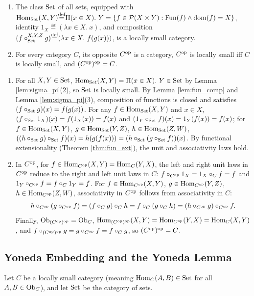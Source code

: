 \documentclass[10pt,a4paper]{article}
\begin{document}
\begin{lemma}\label{lem:set_and_op}
\begin{enumerate}
\item The class ${\textrm{Set}}$ of all sets, equipped with ${\textrm{Hom}}_{\textrm{Set}}(X,Y) {\stackrel{{\textrm{def}}}{=}} \Pi(x \in X).\ Y = \{f \in {\mathcal{P}}(X \times Y) : {\textrm{Fun}}(f) \land {\textrm{dom}}(f) = X\}$, identity $1_X \eqdef (\lambda x \in X.\ x)$, and composition $(f \circ_{\textrm{Set}}^{X,Y,Z} g) {\stackrel{{\textrm{def}}}{=}} (\lambda x \in X.\ f(g(x)))$, is a locally small category.
\item For every category $C$, its opposite $C^{\textrm{op}}$ is a category, $C^{\textrm{op}}$ is locally small iff $C$ is locally small, and $(C^{\textrm{op}})^{\textrm{op}} = C$.
\end{enumerate}
\end{lemma}
\myprf
\begin{enumerate}
\item For all $X, Y \in {\textrm{Set}}$, ${\textrm{Hom}}_{\textrm{Set}}(X,Y) = \Pi(x \in X).\ Y \in {\textrm{Set}}$ by Lemma \ref{lem:sigma_pi}(2), so ${\textrm{Set}}$ is locally small. By Lemma \ref{lem:fun_comp} and Lemma \ref{lem:sigma_pi}(3), composition of functions is closed and satisfies $(f \circ_{\textrm{Set}} g)(x) = f(g(x))$. For any $f \in {\textrm{Hom}}_{\textrm{Set}}(X,Y)$ and $x \in X$, $(f \circ_{\textrm{Set}} 1_X)(x) = f(1_X(x)) = f(x)$ and $(1_Y \circ_{\textrm{Set}} f)(x) = 1_Y(f(x)) = f(x)$; for $f \in {\textrm{Hom}}_{\textrm{Set}}(X,Y)$, $g \in {\textrm{Hom}}_{\textrm{Set}}(Y,Z)$, $h \in {\textrm{Hom}}_{\textrm{Set}}(Z,W)$, $((h \circ_{\textrm{Set}} g) \circ_{\textrm{Set}} f)(x) = h(g(f(x))) = (h \circ_{\textrm{Set}} (g \circ_{\textrm{Set}} f))(x)$. By functional extensionality (Theorem \ref{thm:fun_ext}), the unit and associativity laws hold.
\item In $C^{\textrm{op}}$, for $f \in {\textrm{Hom}}_{C^{\textrm{op}}}(X,Y) = {\textrm{Hom}}_C(Y,X)$, the left and right unit laws in $C^{\textrm{op}}$ reduce to the right and left unit laws in $C$: $f \circ_{C^{\textrm{op}}} 1_X = 1_X \circ_C f = f$ and $1_Y \circ_{C^{\textrm{op}}} f = f \circ_C 1_Y = f$. For $f \in {\textrm{Hom}}_{C^{\textrm{op}}}(X,Y)$, $g \in {\textrm{Hom}}_{C^{\textrm{op}}}(Y,Z)$, $h \in {\textrm{Hom}}_{C^{\textrm{op}}}(Z,W)$, associativity in $C^{\textrm{op}}$ follows from associativity in $C$:
$$h \circ_{C^{\textrm{op}}} (g \circ_{C^{\textrm{op}}} f) = (f \circ_C g) \circ_C h = f \circ_C (g \circ_C h) = (h \circ_{C^{\textrm{op}}} g) \circ_{C^{\textrm{op}}} f.$$
Finally, ${\textrm{Ob}}_{(C^{\textrm{op}})^{\textrm{op}}} = {\textrm{Ob}}_C$, ${\textrm{Hom}}_{(C^{\textrm{op}})^{\textrm{op}}}(X,Y) = {\textrm{Hom}}_{C^{\textrm{op}}}(Y,X) = {\textrm{Hom}}_C(X,Y)$, and $f \circ_{(C^{\textrm{op}})^{\textrm{op}}} g = g \circ_{C^{\textrm{op}}} f = f \circ_C g$, so $(C^{\textrm{op}})^{\textrm{op}} = C$.
\end{enumerate}
\myqed

\subsection{Yoneda Embedding and the Yoneda Lemma}
Let $C$ be a locally small category (meaning ${\textrm{Hom}}_C(A,B) \in {\textrm{Set}}$ for all $A,B \in {\textrm{Ob}}_C$), and let ${\textrm{Set}}$ be the category of sets.
\end{document}
